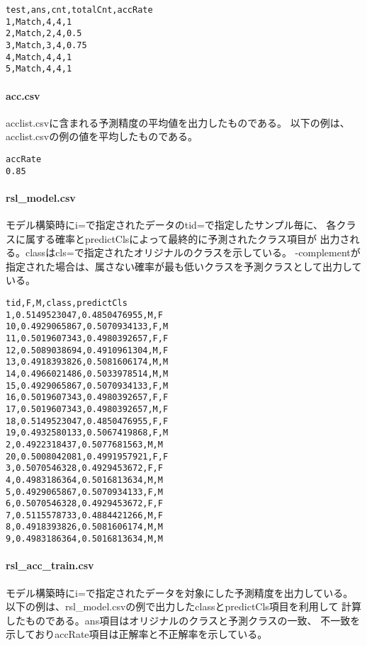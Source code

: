 \begin{Verbatim}[baselinestretch=0.7,frame=single]
test,ans,cnt,totalCnt,accRate
1,Match,4,4,1
2,Match,2,4,0.5
3,Match,3,4,0.75
4,Match,4,4,1
5,Match,4,4,1

\end{Verbatim}


\paragraph{acc.csv}
acclist.csvに含まれる予測精度の平均値を出力したものである。
以下の例は、acclist.csvの例の値を平均したものである。

\begin{Verbatim}[baselinestretch=0.7,frame=single]
accRate
0.85
\end{Verbatim}


\paragraph{rsl\_model.csv}
 モデル構築時にi=で指定されたデータのtid=で指定したサンプル毎に、
各クラスに属する確率とpredictClsによって最終的に予測されたクラス項目が
出力される。classはcls=で指定されたオリジナルのクラスを示している。
-complementが指定された場合は、属さない確率が最も低いクラスを予測クラスとして出力している。

\begin{Verbatim}[baselinestretch=0.7,frame=single]
tid,F,M,class,predictCls
1,0.5149523047,0.4850476955,M,F
10,0.4929065867,0.5070934133,F,M
11,0.5019607343,0.4980392657,F,F
12,0.5089038694,0.4910961304,M,F
13,0.4918393826,0.5081606174,M,M
14,0.4966021486,0.5033978514,M,M
15,0.4929065867,0.5070934133,F,M
16,0.5019607343,0.4980392657,F,F
17,0.5019607343,0.4980392657,M,F
18,0.5149523047,0.4850476955,F,F
19,0.4932580133,0.5067419868,F,M
2,0.4922318437,0.5077681563,M,M
20,0.5008042081,0.4991957921,F,F
3,0.5070546328,0.4929453672,F,F
4,0.4983186364,0.5016813634,M,M
5,0.4929065867,0.5070934133,F,M
6,0.5070546328,0.4929453672,F,F
7,0.5115578733,0.4884421266,M,F
8,0.4918393826,0.5081606174,M,M
9,0.4983186364,0.5016813634,M,M
\end{Verbatim}

\paragraph{rsl\_acc\_train.csv}
モデル構築時にi=で指定されたデータを対象にした予測精度を出力している。
以下の例は、rsl\_model.csvの例で出力したclassとpredictCls項目を利用して
計算したものである。ans項目はオリジナルのクラスと予測クラスの一致、
不一致を示しておりaccRate項目は正解率と不正解率を示している。

